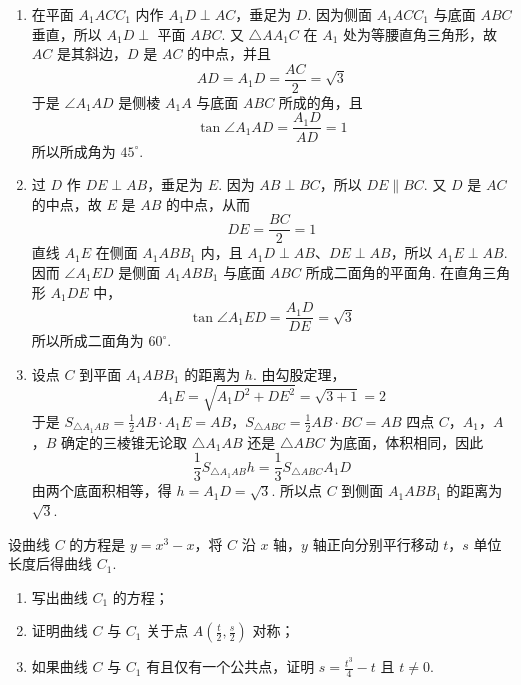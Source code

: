 \begin{solution}
\begin{enumerate}
\item 在平面 \(A_{1}ACC_{1}\) 内作 \(A_{1}D\perp AC\)，垂足为 \(D\). 因为侧面 \(A_{1}ACC_{1}\) 与底面 \(ABC\) 垂直，所以 \(A_{1}D\perp\) 平面 \(ABC\). 又 \(\triangle AA_{1}C\) 在 \(A_{1}\) 处为等腰直角三角形，故 \(AC\) 是其斜边，\(D\) 是 \(AC\) 的中点，并且
\[
AD=A_{1}D=\frac{AC}{2}=\sqrt{3}
\]
于是 \(\angle A_{1}AD\) 是侧棱 \(A_{1}A\) 与底面 \(ABC\) 所成的角，且
\[
\tan\angle A_{1}AD=\frac{A_{1}D}{AD}=1
\]
所以所成角为 \(45^{\circ}\).

\item 过 \(D\) 作 \(DE\perp AB\)，垂足为 \(E\). 因为 \(AB\perp BC\)，所以 \(DE\parallel BC\). 又 \(D\) 是 \(AC\) 的中点，故 \(E\) 是 \(AB\) 的中点，从而
\[
DE=\frac{BC}{2}=1
\]
直线 \(A_{1}E\) 在侧面 \(A_{1}ABB_{1}\) 内，且 \(A_{1}D\perp AB\)、\(DE\perp AB\)，所以 \(A_{1}E\perp AB\). 因而 \(\angle A_{1}ED\) 是侧面 \(A_{1}ABB_{1}\) 与底面 \(ABC\) 所成二面角的平面角. 在直角三角形 \(A_{1}DE\) 中，
\[
\tan\angle A_{1}ED=\frac{A_{1}D}{DE}=\sqrt{3}
\]
所以所成二面角为 \(60^{\circ}\).

\item 设点 \(C\) 到平面 \(A_{1}ABB_{1}\) 的距离为 \(h\). 由勾股定理，
\[
A_{1}E=\sqrt{A_{1}D^{2}+DE^{2}}=\sqrt{3+1}=2
\]
于是
\(S_{\triangle A_{1}AB}=\frac12 AB\cdot A_{1}E=AB\)，\(S_{\triangle ABC}=\frac12 AB\cdot BC=AB\)
四点 \(C\)，\(A_{1}\)，\(A\)，\(B\) 确定的三棱锥无论取 \(\triangle A_{1}AB\) 还是 \(\triangle ABC\) 为底面，体积相同，因此
\[
\frac13S_{\triangle A_{1}AB}h=\frac13S_{\triangle ABC}A_{1}D
\]
由两个底面积相等，得 \(h=A_{1}D=\sqrt{3}\). 所以点 \(C\) 到侧面 \(A_{1}ABB_{1}\) 的距离为 \(\sqrt{3}\).
\end{enumerate}
\end{solution}

\begin{problem}
设曲线 \(C\) 的方程是 \(y = x^{3} - x\)，将 \(C\) 沿 \(x\) 轴，\(y\) 轴正向分别平行移动 \(t\)，\(s\) 单位长度后得曲线 \(C_{1}\).

\begin{enumerate}
\item 写出曲线 \(C_{1}\) 的方程；
\item 证明曲线 \(C\) 与 \(C_{1}\) 关于点 \(A\left(\frac{t}{2}, \frac{s}{2}\right)\) 对称；
\item 如果曲线 \(C\) 与 \(C_{1}\) 有且仅有一个公共点，证明 \(s = \frac{t^{3}}{4} - t\) 且 \(t \neq 0\).
\end{enumerate}
\end{problem}

